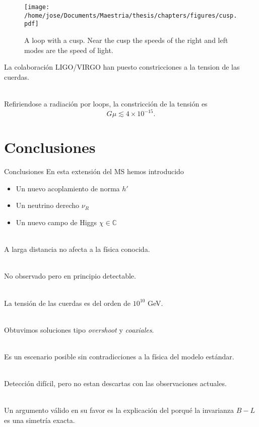 \documentclass[14pt]{beamer}
\begin{document}
\begin{frame}
	\begin{figure}
	\centering
	\texttt{[image: /home/jose/Documents/Maestria/thesis/chapters/figures/cusp.pdf]}
	\caption{A loop with a cusp. Near the cusp the speeds of the right and left modes are the speed of light.}
		\label{fig:cusp}
\end{figure}
\end{frame}

\begin{frame}
	La colaboración LIGO/VIRGO han puesto constricciones a la tension de las cuerdas.\\~\
	
	 Refiriendose a radiación por loops, la constricción de la tensión es
	\begin{equation*}
		G\mu \lesssim 4\times 10^{-15}.
	\end{equation*}		
	
\end{frame}

\section{Conclusiones}
\begin{frame}{Conclusiones}
En esta extensión del MS hemos introducido
\begin{itemize}
	\item Un nuevo acoplamiento de norma $h'$ 
	\item Un neutrino derecho $\nu_R$
	\item Un nuevo campo de Higgs $\chi\in\mathbb{C}$ \\~\

\end{itemize}


A larga distancia no afecta a la física conocida.\\~\

No observado pero en principio detectable. \\~\

La tensión de las cuerdas es del orden de $10^{10}$ GeV.\\~\

\end{frame}

\begin{frame}

Obtuvimos soluciones tipo \textit{overshoot} y \textit{coaxiales}.\\~\

Es un escenario posible sin contradicciones a la física del modelo estándar.\\~\

Detección difícil, pero no estan descartas con las observaciones actuales.\\~\

Un argumento válido en su favor es la explicación del porqué la invarianza $B-L$ es una simetría exacta.

\end{frame}
\end{document}
